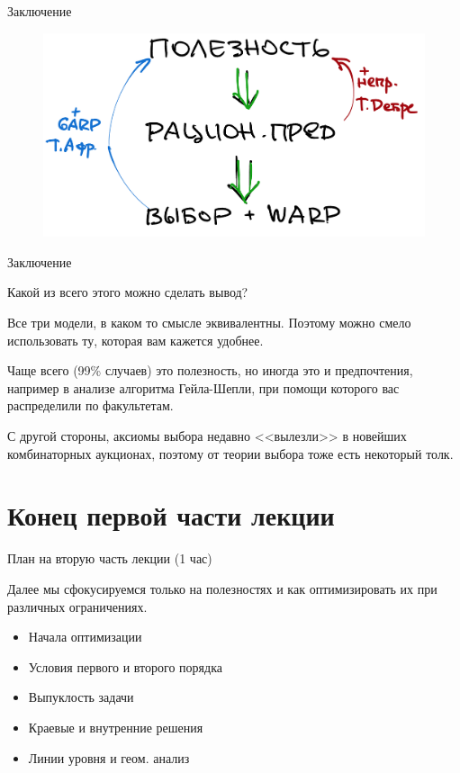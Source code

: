 \documentclass{beamer}
\begin{document}
\begin{frame}{Заключение}

\begin{figure}[hbt]
\centering
\includegraphics[width=1 \textwidth]{arch.png}
\end{figure}

\end{frame}

\begin{frame}{Заключение}

Какой из всего этого можно сделать вывод?

Все три модели, в каком то смысле эквивалентны. Поэтому можно смело использовать ту, которая вам кажется удобнее. 

Чаще всего (99\% случаев) это полезность, но иногда это и предпочтения, например в анализе алгоритма Гейла-Шепли, при помощи которого вас распределили по факультетам. 

С другой стороны, аксиомы выбора недавно <<вылезли>> в новейших комбинаторных аукционах, поэтому от теории выбора тоже есть некоторый толк.

\end{frame}

\section{Конец первой части лекции}

\begin{frame}{План на вторую часть лекции (1 час)}

Далее мы сфокусируемся только на полезностях и как оптимизировать их при различных ограничениях.

\begin{itemize}
  \item Начала оптимизации
  \item Условия первого и второго порядка
  \item Выпуклость задачи
  \item Краевые и внутренние решения
  \item Линии уровня и геом. анализ
\end{itemize}


\end{frame}
\end{document}
